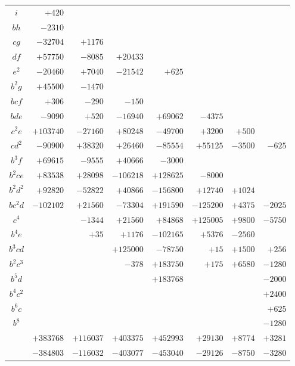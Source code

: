 \documentclass[11pt]{article}
\begin{document}
\medskip
\noindent
\begin{tabular}{|c|rrrrrrr|}\hline
$i$       & $+420$ &        &       &        &        &       &       \\
$bh$      & $-2310$ &       &       &        &        &       &       \\
$cg$      & $-32704$ & $+1176$ &     &        &        &       &       \\
$df$      & $+57750$ & $-8085$ & $+20433$ &  &        &       &       \\
$e^2$     & $-20460$ & $+7040$ & $-21542$ & $+625$ &  &       &       \\
$b^2 g$   & $+45500$ & $-1470$ &      &      &        &       &       \\
$bcf$     & $+306$ & $-290$ & $-150$ &     &        &       &       \\
$bde$     & $-9090$ & $+520$ & $-16940$ & $+69062$ & $-4375$ &   &       \\
$c^2 e$   & $+103740$ & $-27160$ & $+80248$ & $-49700$ & $+3200$ & $+500$ &   \\
$cd^2$    & $-90900$ & $+38320$ & $+26460$ & $-85554$ & $+55125$ & $-3500$ & $-625$ \\
$b^3 f$   & $+69615$ & $-9555$ & $+40666$ & $-3000$ &     &       &       \\
$b^2 ce$  & $+83538$ & $+28098$ & $-106218$ & $+128625$ & $-8000$ &  &       \\
$b^2 d^2$ & $+92820$ & $-52822$ & $+40866$ & $-156800$ & $+12740$ & $+1024$ &   \\
$bc^2 d$  & $-102102$ & $+21560$ & $-73304$ & $+191590$ & $-125200$ & $+4375$ & $-2025$ \\
$c^4$     &        & $-1344$ & $+21560$ & $+84868$ & $+125005$ & $+9800$ & $-5750$ \\
$b^4 e$   &        & $+35$  & $+1176$ & $-102165$ & $+5376$ & $-2560$ &       \\
$b^3 cd$  &        &       & $+125000$ & $-78750$ & $+15$ & $+1500$ & $+256$ \\
$b^2 c^3$ &        &       & $-378$ & $+183750$ & $+175$ & $+6580$ & $-1280$ \\
$b^5 d$   &        &       &       & $+183768$ &        &       & $-2000$ \\
$b^4 c^2$ &        &       &       &        &        &       & $+2400$ \\
$b^6 c$   &        &       &       &        &        &       & $+625$ \\
$b^8$     &        &       &       &        &        &       & $-1280$ \\\hline
          & $+383768$ & $+116037$ & $+403375$ & $+452993$ & $+29130$ & $+8774$ & $+3281$ \\
          & $-384803$ & $-116032$ & $-403077$ & $-453040$ & $-29126$ & $-8750$ & $-3280$ \\\hline
\end{tabular}
\end{document}
